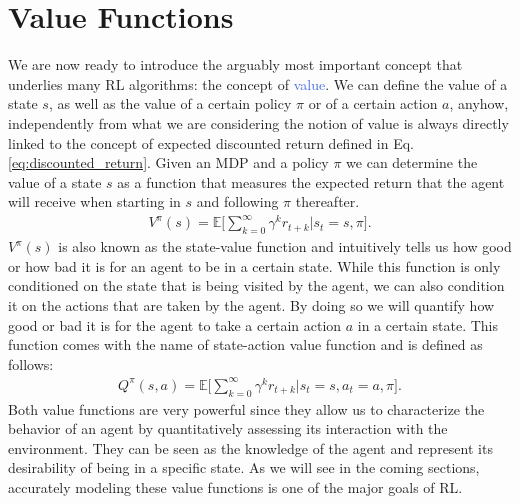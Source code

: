 \section{Value Functions}
\label{sec:value_functions}
We are now ready to introduce the arguably most important concept that underlies many RL algorithms: the concept of \textcolor{RoyalBlue}{value}. We can define the value of a state $s$, as well as the value of a certain policy $\pi$ or of a certain action $a$, anyhow, independently from what we are considering the notion of value is always directly linked to the concept of expected discounted return defined in Eq. \ref{eq:discounted_return}. Given an MDP and a policy $\pi$ we can determine the value of a state $s$ as a function that measures the expected return that the agent will receive when starting in $s$ and following $\pi$ thereafter. 
\begin{align}
    V^{\pi}(s)=\mathds{E}\bigg[\sum_{k=0}^{\infty}\gamma^{k}r_{t+k}\bigg| s_t = s, \pi \bigg].
    \label{eq:state_value_function}
\end{align}
$V^{\pi}(s)$ is also known as the state-value function and intuitively tells us how good or how bad it is for an agent to be in a certain state. While this function is only conditioned on the state that is being visited by the agent, we can also condition it on the actions that are taken by the agent. By doing so we will quantify how good or bad it is for the agent to take a certain action $a$ in a certain state. This function comes with the name of state-action value function and is defined as follows:
\begin{align}
     Q^{\pi}(s,a)=\mathds{E}\bigg[\sum_{k=0}^{\infty}\gamma^{k}r_{t+k} \bigg| s_t = s, a_t=a, \pi\bigg].
 \end{align}
Both value functions are very powerful since they allow us to characterize the behavior of an agent by quantitatively assessing its interaction with the environment. They can be seen as the knowledge of the agent and represent its desirability of being in a specific state. As we will see in the coming sections, accurately modeling these value functions is one of the major goals of RL.  


